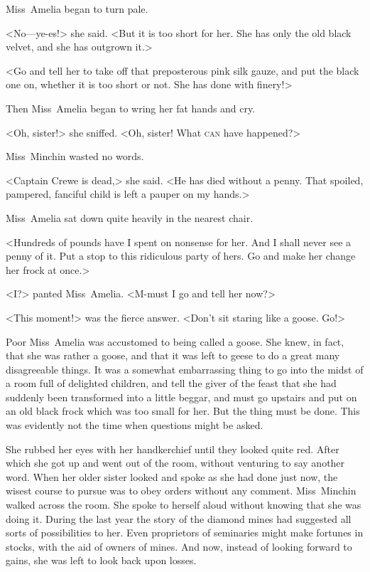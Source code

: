 Miss~Amelia began to turn pale.

<No—ye-es!> she said. <But it is too short for her. She has only the old black velvet, and she has outgrown it.>

<Go and tell her to take off that preposterous pink silk gauze, and put the black one on, whether it is too short or not. She has done with finery!>

Then Miss~Amelia began to wring her fat hands and cry.

<Oh, sister!> she sniffed. <Oh, sister! What \textsc{can} have happened?>

Miss~Minchin wasted no words.

<Captain Crewe is dead,> she said. <He has died without a penny. That spoiled, pampered, fanciful child is left a pauper on my hands.>

Miss~Amelia sat down quite heavily in the nearest chair.

<Hundreds of pounds have I spent on nonsense for her. And I shall never see a penny of it. Put a stop to this ridiculous party of hers. Go and make her change her frock at once.>

<I\@?> panted Miss~Amelia. <M-must I go and tell her now?>

<This moment!> was the fierce answer. <Don't sit staring like a goose. Go!>

Poor Miss~Amelia was accustomed to being called a goose. She knew, in fact, that she was rather a goose, and that it was left to geese to do a great many disagreeable things. It was a somewhat embarrassing thing to go into the midst of a room full of delighted children, and tell the giver of the feast that she had suddenly been transformed into a little beggar, and must go upstairs and put on an old black frock which was too small for her. But the thing must be done. This was evidently not the time when questions might be asked.

She rubbed her eyes with her handkerchief until they looked quite red. After which she got up and went out of the room, without venturing to say another word. When her older sister looked and spoke as she had done just now, the wisest course to pursue was to obey orders without any comment. Miss~Minchin walked across the room. She spoke to herself aloud without knowing that she was doing it. During the last year the story of the diamond mines had suggested all sorts of possibilities to her. Even proprietors of seminaries might make fortunes in stocks, with the aid of owners of mines. And now, instead of looking forward to gains, she was left to look back upon losses.

